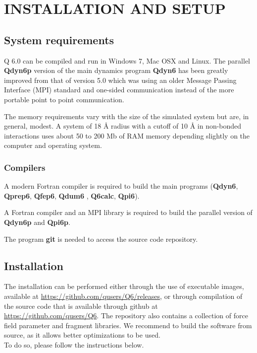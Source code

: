 \documentclass[a4paper,11pt]{article}
\begin{document}
\section{INSTALLATION AND SETUP}
\subsection{System requirements} 
Q 6.0 can  be compiled and run  in Windows 7, Mac OSX  and Linux.  The
parallel  \textbf{Qdyn6p}   version  of   the  main   dynamics  program
\textbf{Qdyn6} has been greatly improved from that of version 5.0 which
was  using  an older  Message  Passing  Interface (MPI)  standard  and
one-sided communication  instead of the  more portable point  to point
communication.

The memory requirements vary with the size of the simulated system but
are, in general, modest.  A system of  18 {\AA} radius with a cutoff of 10
{\AA}  in non-bonded  interactions uses  about  50 to  200 Mb  of RAM  memory
depending slightly on the computer and operating system.

\subsubsection{Compilers} 
A  modern Fortran  compiler is  required  to build  the main  programs
(\textbf{Qdyn6},   \textbf{Qprep6},   \textbf{Qfep6},   \textbf{Qdum6}   ,
\textbf{Q6calc}, \textbf{Qpi6}).

A  Fortran compiler  and  an  MPI library  is  required  to build  the
parallel version of \textbf{Qdyn6p} and \textbf{Qpi6p}.

The program \textbf{git} is needed to access the source code repository.

\subsection{Installation}
The installation can be performed either through the use of 
executable images, available at \url{https://github.com/qusers/Q6/releases},
or through compilation of the source code that is available through github
at \url{https://github.com/qusers/Q6}. The repository also contains
a collection of force field parameter and fragment libraries. 
We recommend to build the software from
source, as it allows better optimizations to be used.\\
To do so, please follow the instructions below.
\end{document}
